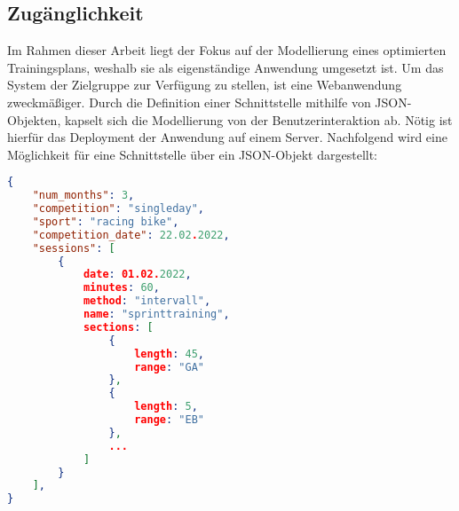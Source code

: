 \subsection{Zugänglichkeit}
Im Rahmen dieser Arbeit liegt der Fokus auf der Modellierung eines optimierten Trainingsplans, weshalb sie als eigenständige Anwendung umgesetzt ist. Um das System der Zielgruppe zur Verfügung zu stellen, ist eine Webanwendung zweckmäßiger. 
Durch die Definition einer Schnittstelle mithilfe von JSON-Objekten, kapselt sich die Modellierung von der Benutzerinteraktion ab. Nötig ist hierfür das Deployment der Anwendung auf einem Server. Nachfolgend wird eine Möglichkeit für eine Schnittstelle über ein JSON-Objekt dargestellt:
\begin{lstlisting}[language=json,firstnumber=1]
{ 
    "num_months": 3,
    "competition": "singleday",
    "sport": "racing bike",
    "competition_date": 22.02.2022,
    "sessions": [
        {
            date: 01.02.2022,
            minutes: 60,
            method: "intervall",
            name: "sprinttraining", 
            sections: [
                {
                    length: 45,
                    range: "GA"
                },
                {
                    length: 5,
                    range: "EB"
                },
                ...
            ]
        }
    ], 
}
\end{lstlisting}




